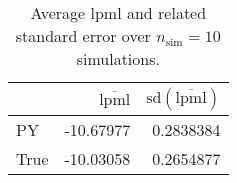 \begin{table}[H]

\caption{Average lpml and related standard error over $n_{\text{sim}} = 10$ simulations.}
\centering
\begin{tabular}[t]{lrr}
\toprule
  & $\overbar{\text{lpml}}$ & $\text{sd}(\overbar{\text{lpml}})$\\
\midrule
PY & -10.67977 & 0.2838384\\
True & -10.03058 & 0.2654877\\
\bottomrule
\end{tabular}
\end{table}